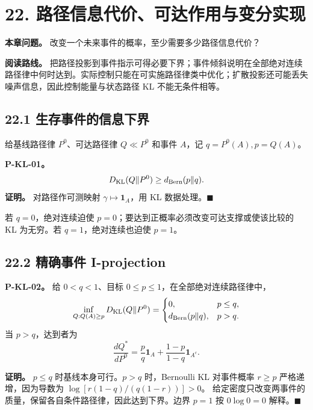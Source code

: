 \documentclass[
  11pt,
  oneside]{book}
\begin{document}
\chapter{22. 路径信息代价、可达作用与变分实现}\label{ch-22}

\textbf{本章问题。} 改变一个未来事件的概率，至少需要多少路径信息代价？

\textbf{阅读路线。} 把路径投影到事件指示可得必要下界；事件倾斜说明在全部绝对连续路径律中何时达到。实际控制只能在可实施路径律类中优化；扩散投影还可能丢失噪声信息，因此控制能量与状态路径 KL 不能无条件相等。

\section{22.1 生存事件的信息下界}\label{ux751fux5b58ux4e8bux4ef6ux7684ux4fe1ux606fux4e0bux754c}

给基线路径律 \(P^0\)、可达路径律 \(Q\ll P^0\) 和事件 \(A\)，记 \(q=P^0(A),p=Q(A)\)。

\hypertarget{p-kl-01}{}\label{p-kl-01}

\textbf{P-KL-01。} \[D_{\rm KL}(Q\|P^0)\ge
d_{\rm Bern}(p\|q).\] \textbf{证明。} 对路径作可测映射 \(\gamma\mapsto\mathbf1_A\)，用 KL 数据处理。\(\blacksquare\)

若 \(q=0\)，绝对连续迫使 \(p=0\)；要达到正概率必须改变可达支撑或使该比较的 KL 为无穷。若 \(q=1\)，绝对连续也迫使 \(p=1\)。

\section{22.2 精确事件 I-projection}\label{ux7cbeux786eux4e8bux4ef6-i-projection}

\hypertarget{p-kl-02}{}\label{p-kl-02}

\textbf{P-KL-02。} 给 \(0<q<1\)、目标 \(0\le p\le1\)，在全部绝对连续路径律中， \[\inf_{Q:Q(A)\ge p}D_{\rm KL}(Q\|P^0)
=
\begin{cases}
0,&p\le q,\\
d_{\rm Bern}(p\|q),&p>q.
\end{cases}\] 当 \(p>q\)，达到者为 \[\frac{dQ^*}{dP^0}
=\frac pq\mathbf1_A+
\frac{1-p}{1-q}\mathbf1_{A^c}.\]

\textbf{证明。} \(p\le q\) 时基线本身可行。\(p>q\) 时，Bernoulli KL 对事件概率 \(r\ge p\) 严格递增，因为导数为 \(\log[r(1-q)/(q(1-r))]>0\)。 给定密度只改变两事件的质量，保留各自条件路径律，因此达到下界。边界 \(p=1\) 按 \(0\log0=0\) 解释。\(\blacksquare\)
\end{document}
